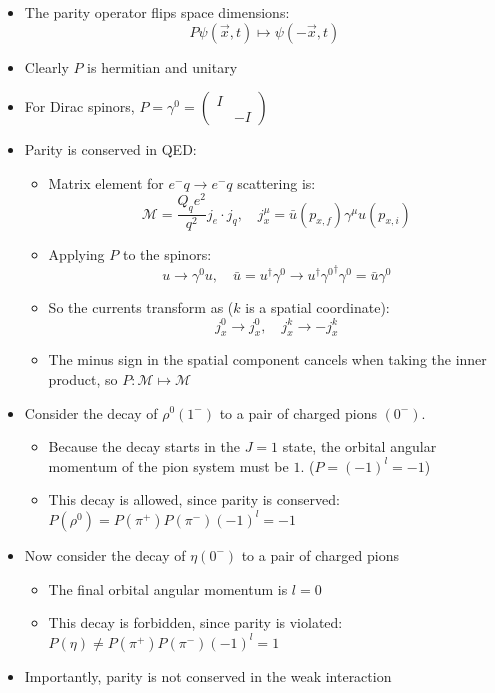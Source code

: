 \documentclass[11pt]{article}
\newcommand{\x}{\vec{x}}
\newcommand{\ubar}{\bar{u}}
\newcommand{\Mme}{\mathcal{M}}
\newcommand{\el}{\ensuremath{e^{-}}}
\begin{document}
\begin{itemize}
  \item The parity operator flips space dimensions:
  \begin{equation}
    P \psi(\x,t)\mapsto \psi(-\x,t)
  \end{equation}
  \item Clearly $P$ is hermitian and unitary
  \item For Dirac spinors, $P = \gamma^0 = \begin{pmatrix} I & \\ & -I \end{pmatrix}$
  \item Parity is conserved in QED:
  \begin{itemize}
    \item Matrix element for $\el q \rightarrow \el q$ scattering is:
    \begin{equation}
      \Mme = \frac{Q_qe^2}{q^2}j_e \cdot j_q, \quad j_x^\mu = \ubar(p_{x,f})\gamma^\mu u(p_{x,i})
    \end{equation}
    \item Applying $P$ to the spinors:
    \begin{equation}
      u \rightarrow \gamma^0 u, \quad \ubar = u^\dag\gamma^0 \rightarrow u^\dag {\gamma^0}^\dag \gamma^0 = \ubar \gamma^0
    \end{equation}
    \item So the currents transform as ($k$ is a spatial coordinate):
    \begin{equation}
      j_x^0 \rightarrow j_x^0, \quad j_x^k \rightarrow -j_x^k
    \end{equation}
    \item The minus sign in the spatial component cancels when taking the inner product, so $P:\Mme \mapsto \Mme$
  \end{itemize}
  \item Consider the decay of $\rho^0(1^-)$ to a pair of charged pions $(0^-)$. 
  \begin{itemize}
    \item Because the decay starts in the $J=1$ state, the orbital angular momentum of the pion system must be $1$. ($P = (-1)^l = -1$)
    \item This decay is allowed, since parity is conserved: $P(\rho^0) = P(\pi^+)P(\pi^-)(-1)^l = -1$
  \end{itemize}
  \item Now consider the decay of $\eta(0^-)$ to a pair of charged pions
  \begin{itemize}
    \item The final orbital angular momentum is $l=0$
    \item This decay is forbidden, since parity is violated: $P(\eta) \neq P(\pi^+)P(\pi^-)(-1)^l = 1$
  \end{itemize}
  \item Importantly, parity is not conserved in the weak interaction
\end{itemize}
\end{document}

